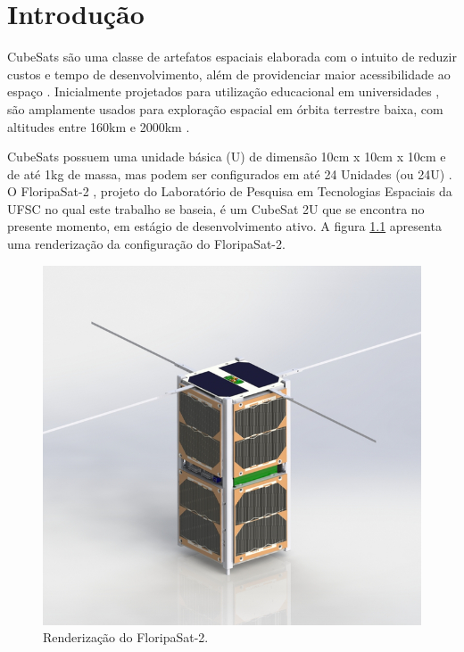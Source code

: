 \chapter{Introdução}
\label{chapter:introducao}
CubeSats são uma classe de artefatos espaciais elaborada com o intuito de reduzir custos e tempo de desenvolvimento, além de providenciar maior acessibilidade ao espaço \cite{cubesat-spec}. Inicialmente projetados para utilização educacional em universidades \cite{burt2011}, são amplamente usados para exploração espacial em órbita terrestre baixa, com altitudes entre 160km e 2000km \cite{alanazi2019}.

CubeSats possuem uma unidade básica (U) de dimensão 10cm x 10cm x 10cm e de até 1kg de massa, mas podem ser configurados em até 24 Unidades (ou 24U) \cite{cubesat}. O FloripaSat-2 \cite{floripasat2}, projeto do Laboratório de Pesquisa em Tecnologias Espaciais da UFSC no qual este trabalho se baseia, é um CubeSat 2U que se encontra no presente momento, em estágio de desenvolvimento ativo. A figura \ref{fig:floripasat2-diagram} apresenta uma renderização da configuração do FloripaSat-2.

\begin{figure}[H]
\caption{\label{fig:floripasat2-diagram}Renderização do FloripaSat-2.}
\begin{center}
\includegraphics[scale=0.5]{images/floripasat-2-diagram.jpg}
\end{center}
\end{figure}
\newpage


